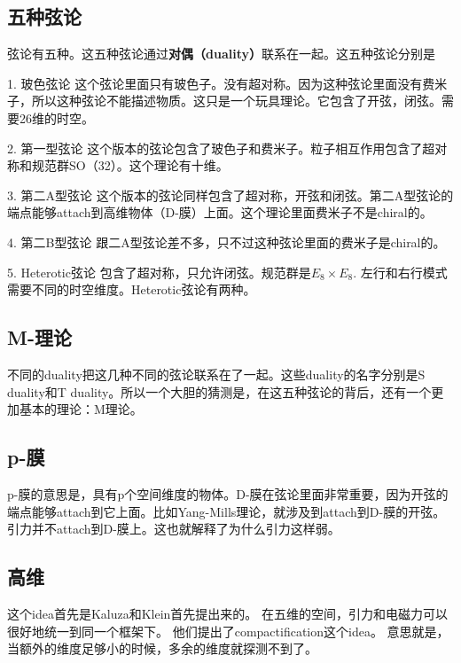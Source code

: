 
\begin{issues}
\issueNeedCite
\issueMissDepend
\end{issues}

\subsection{五种弦论}

弦论有五种。这五种弦论通过\textbf{对偶（duality）}联系在一起。这五种弦论分别是

1. 玻色弦论
这个弦论里面只有玻色子。没有超对称。因为这种弦论里面没有费米子，所以这种弦论不能描述物质。这只是一个玩具理论。它包含了开弦，闭弦。需要26维的时空。

2. 第一型弦论
这个版本的弦论包含了玻色子和费米子。粒子相互作用包含了超对称和规范群SO（32）。这个理论有十维。

3. 第二A型弦论
这个版本的弦论同样包含了超对称，开弦和闭弦。第二A型弦论的端点能够attach到高维物体（D-膜）上面。这个理论里面费米子不是chiral的。

4. 第二B型弦论
跟二A型弦论差不多，只不过这种弦论里面的费米子是chiral的。

5. Heterotic弦论
包含了超对称，只允许闭弦。规范群是$E_8\times E_8$. 左行和右行模式需要不同的时空维度。Heterotic弦论有两种。

\subsection{M-理论}
不同的duality把这几种不同的弦论联系在了一起。这些duality的名字分别是S duality和T duality。所以一个大胆的猜测是，在这五种弦论的背后，还有一个更加基本的理论：M理论。

\subsection{p-膜}
p-膜的意思是，具有p个空间维度的物体。D-膜在弦论里面非常重要，因为开弦的端点能够attach到它上面。比如Yang-Mills理论，就涉及到attach到D-膜的开弦。 引力并不attach到D-膜上。这也就解释了为什么引力这样弱。

\subsection{高维}
这个idea首先是Kaluza和Klein首先提出来的。 在五维的空间，引力和电磁力可以很好地统一到同一个框架下。 他们提出了compactification这个idea。
意思就是，当额外的维度足够小的时候，多余的维度就探测不到了。 
